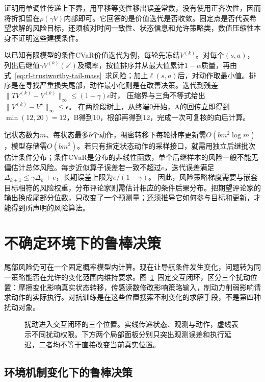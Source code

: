证明用单调性传递上下界，用平移等变性移出误差常数，没有使用正齐次性，因而将折扣留在$\rho(\gamma V)$内部即可。它回答的是价值迭代是否收敛。固定点是否代表希望求解的风险目标，还须核对时间一致性、状态信息和允许策略类，数值压缩性本身不证明这些建模条件。

以已知有限模型的条件CVaR价值迭代为例，每轮先冻结$V^{(k)}$。对每个$(s,a)$，列出后继值$\gamma V^{(k)}(s')$及概率，按值排序并从最大值累计$1-\alpha$质量，再由式~\eqref{eq:rl-trustworthy-tail-mass}~求风险；加上$\ell(s,a)$后，对动作取最小值。排序是在寻找严重损失尾部，动作最小化则是在改善决策。迭代到残差
$\lVert TV^{(k)}-V^{(k)}\rVert_\infty\leq(1-\gamma)\epsilon$时，
压缩界与三角不等式给出
$\lVert V^{(k)}-V^\star\rVert_\infty\leq\epsilon$。
在两阶段树上，从终端0开始，A的回传立即得到$\min(12,20)=12$，B得到10，根部再得到12，完成一次可复核的向后计算。

记状态数为$m$、每状态最多$b$个动作，稠密转移下每轮排序更新需$O(bm^2\log m)$，模型存储需$O(bm^2)$。若只有指定状态动作的采样接口，就需用独立后继批次估计条件分布；条件CVaR是分布的非线性函数，单个后继样本的风险一般不能无偏估计总体风险。每步近似算子误差若一致不超过$e$，迭代误差满足
$\Delta_{k+1}\leq\gamma\Delta_k+e$，长期误差上限为$e/(1-\gamma)$。
因此，风险策略梯度需要与嵌套目标相符的风险权重，分布评论家则需估计相应的条件后果分布。把期望评论家的输出换成尾部分位数，只改变了一个预测量；还须推导它如何参与目标和更新，才能得到所声明的风险算法。

\section{不确定环境下的鲁棒决策}
\label{sec:rl-trustworthy-robust}

尾部风险仍可在一个固定概率模型内计算。现在让导航条件发生变化，问题转为同一策略能否在允许的变化范围内维持要求。图~\ref{fig:rl-trustworthy-channels}~固定交互闭环，区分三个扰动位置：摩擦变化影响真实状态转移，传感读数修改影响策略输入，制动力削弱影响请求动作的实际执行。对抗训练是在这些位置搜索不利变化的求解手段，不是第四种扰动对象。

\begin{figure}[t]
  \centering
  
  \caption{扰动进入交互闭环的三个位置。实线传递状态、观测与动作，虚线表示不同扰动权限。下方两个局部面板分别只突出观测误差和执行延迟，二者均不等于直接改变当前真实位置。}
  \label{fig:rl-trustworthy-channels}
\end{figure}

\subsection{环境机制变化下的鲁棒决策}
\label{sec:rl-trustworthy-mechanism}

